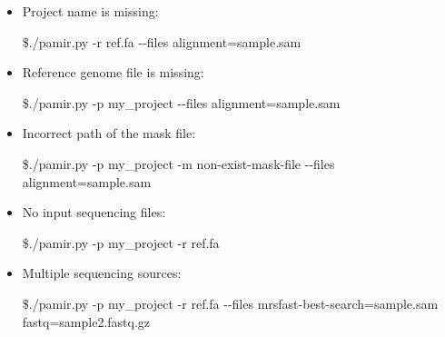 \documentclass{article}
\begin{document}
\begin{itemize}
\item Project name is missing:
\begin{flushleft}
\$./pamir.py -r ref.fa -{}-files alignment=sample.sam
\end{flushleft}

\item  Reference genome file is missing:
\begin{flushleft}
\$./pamir.py -p my\_project -{}-files alignment=sample.sam
\end{flushleft}

\item Incorrect path of the mask file:
\begin{flushleft}
\$./pamir.py -p my\_project -m non-exist-mask-file -{}-files alignment=sample.sam
\end{flushleft}

\item No input sequencing files:
\begin{flushleft}
\$./pamir.py -p my\_project -r ref.fa
\end{flushleft}

\item Multiple sequencing sources:
\begin{flushleft}
\$./pamir.py -p my\_project  -r ref.fa -{}-files mrsfast-best-search=sample.sam fastq=sample2.fastq.gz
\end{flushleft}

\end{itemize}
\end{document}
